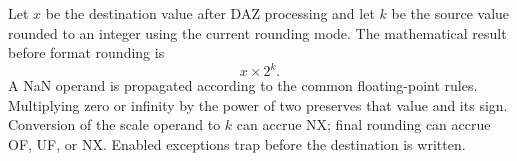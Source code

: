 Let \(x\) be the destination value after DAZ processing and let \(k\) be the source value rounded to an integer using the current rounding mode. The mathematical result before format rounding is
\[
  x \times 2^k .
\]
A NaN operand is propagated according to the common floating-point rules. Multiplying zero or infinity by the power of two preserves that value and its sign. Conversion of the scale operand to \(k\) can accrue NX; final rounding can accrue OF, UF, or NX. Enabled exceptions trap before the destination is written.
